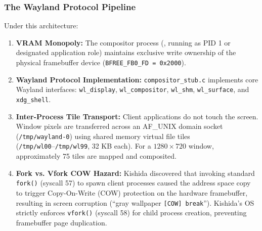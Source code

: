 \documentclass[10pt,journal,compsoc,twocolumn]{article}
\begin{document}
\subsubsection{The Wayland Protocol Pipeline}
Under this architecture:
\begin{enumerate}[leftmargin=*]
    \item \textbf{VRAM Monopoly:} The compositor process (, running as PID 1 or designated application role) maintains exclusive write ownership of the physical framebuffer device (\texttt{BFREE\_FB0\_FD = 0x2000}).
    \item \textbf{Wayland Protocol Implementation:} \texttt{compositor\_stub.c} implements core Wayland interfaces: \texttt{wl\_display}, \texttt{wl\_compositor}, \texttt{wl\_shm}, \texttt{wl\_surface}, and \texttt{xdg\_shell}.
    \item \textbf{Inter-Process Tile Transport:} Client applications do not touch the screen. Window pixels are transferred across an AF\_UNIX domain socket (\texttt{/tmp/wayland-0}) using shared memory virtual file tiles (\texttt{/tmp/wl00}--\texttt{/tmp/wl99}, 32 KB each). For a $1280 \times 720$ window, approximately 75 tiles are mapped and composited.
    \item \textbf{Fork vs. Vfork COW Hazard:} Kishida discovered that invoking standard \texttt{fork()} (syscall 57) to spawn client processes caused the address space copy to trigger Copy-On-Write (COW) protection on the hardware framebuffer, resulting in screen corruption (``gray wallpaper \texttt{[COW] break}''). Kishida's OS strictly enforces \texttt{vfork()} (syscall 58) for child process creation, preventing framebuffer page duplication.
\end{enumerate}
\end{document}
